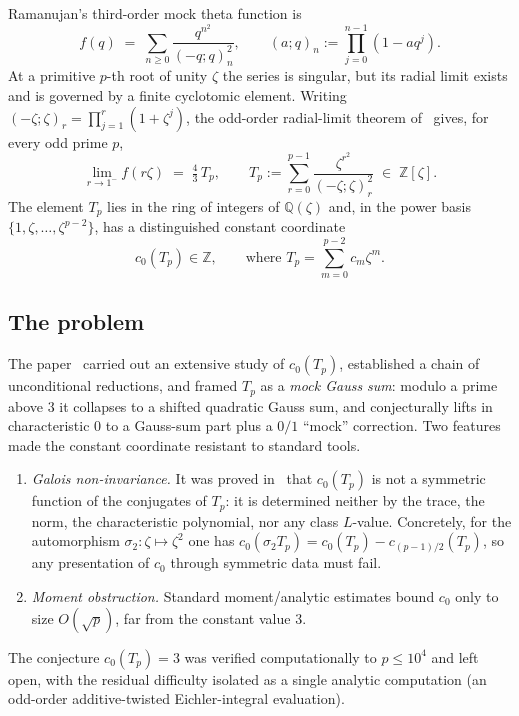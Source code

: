 \documentclass[11pt]{article}
\theoremstyle{definition}
\newcommand{\Z}{\mathbb{Z}}
\newcommand{\Q}{\mathbb{Q}}
\begin{document}
Ramanujan's third-order mock theta function is
\[
  f(q)\;=\;\sum_{n\ge0}\frac{q^{n^2}}{(-q;q)_n^{2}},\qquad
  (a;q)_n:=\prod_{j=0}^{n-1}(1-aq^{j}).
\]
At a primitive $p$-th root of unity $\zeta$ the series is singular, but its radial limit exists and is governed by a finite cyclotomic element. Writing $(-\zeta;\zeta)_r=\prod_{j=1}^r(1+\zeta^{j})$, the odd-order radial-limit theorem of~\cite{Burke2026} gives, for every odd prime $p$,
\begin{equation}\label{eq:radial}
  \lim_{r\to1^{-}}f(r\zeta)\;=\;\tfrac43\,T_p,
  \qquad
  T_p:=\sum_{r=0}^{p-1}\frac{\zeta^{r^2}}{(-\zeta;\zeta)_r^{2}}\;\in\;\Z[\zeta].
\end{equation}
The element $T_p$ lies in the ring of integers of $\Q(\zeta)$ and, in the power basis $\{1,\zeta,\dots,\zeta^{p-2}\}$, has a distinguished constant coordinate
\[
  c_0(T_p)\in\Z,\qquad\text{where } T_p=\sum_{m=0}^{p-2}c_m\zeta^{m}.
\]

\subsection*{The problem}
The paper~\cite{Burke2026} carried out an extensive study of $c_0(T_p)$, established a chain of unconditional reductions, and framed $T_p$ as a \emph{mock Gauss sum}: modulo a prime above $3$ it collapses to a shifted quadratic Gauss sum, and conjecturally lifts in characteristic $0$ to a Gauss-sum part plus a $0/1$ ``mock'' correction. Two features made the constant coordinate resistant to standard tools.
\begin{enumerate}[leftmargin=2em]
  \item \emph{Galois non-invariance.} It was proved in~\cite{Burke2026} that $c_0(T_p)$ is not a symmetric function of the conjugates of $T_p$: it is determined neither by the trace, the norm, the characteristic polynomial, nor any class $L$-value. Concretely, for the automorphism $\sigma_2:\zeta\mapsto\zeta^2$ one has $c_0(\sigma_2 T_p)=c_0(T_p)-c_{(p-1)/2}(T_p)$, so any presentation of $c_0$ through symmetric data must fail.
  \item \emph{Moment obstruction.} Standard moment/analytic estimates bound $c_0$ only to size $O(\sqrt p)$, far from the constant value $3$.
\end{enumerate}
The conjecture $c_0(T_p)=3$ was verified computationally to $p\le 10^{4}$ and left open, with the residual difficulty isolated as a single analytic computation (an odd-order additive-twisted Eichler-integral evaluation).
\end{document}
